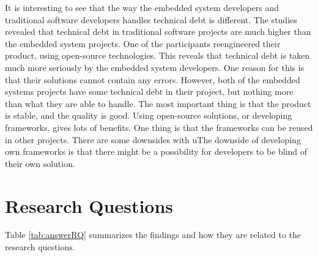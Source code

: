 It is interesting to see that the way the embedded system developers and traditional software developers handles technical debt is different. The studies revealed that technical debt in traditional software projects are much higher than the embedded system projects. One of the participants reengineered their product, using open-source technologies. This reveals that technical debt is taken much more seriously by the embedded system developers. One reason for this is that their solutions cannot contain any errors. However, both of the embedded systems projects have some technical debt in their project, but nothing more than what they are able to handle. The most important thing is that the product is stable, and the quality is good. Using open-source solutions, or developing frameworks, gives lots of benefits. One thing is that the frameworks can be reused in other projects. There are some downsides with uThe downside of developing own frameworks is that there might be a possibility for developers to be blind of their own solution.



\section{Research Questions}
Table \ref{tab:answerRQ} summarizes the findings and how they are related to the research questions. 

